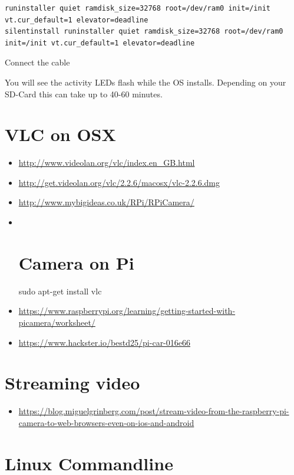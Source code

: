 \begin{verbatim}
runinstaller quiet ramdisk_size=32768 root=/dev/ram0 init=/init vt.cur_default=1 elevator=deadline
silentinstall runinstaller quiet ramdisk_size=32768 root=/dev/ram0 init=/init vt.cur_default=1 elevator=deadline
\end{verbatim}

Connect the cable

You will see the activity LEDs flash while the OS installs. Depending on
your SD-Card this can take up to 40-60 minutes.

\section{VLC on OSX}\label{vlc-on-osx}

\begin{itemize}
\item
  \url{http://www.videolan.org/vlc/index.en_GB.html}
\item
  \url{http://get.videolan.org/vlc/2.2.6/macosx/vlc-2.2.6.dmg}
\item
  \url{http://www.mybigideas.co.uk/RPi/RPiCamera/}
\item ~
  \section{Camera on Pi}\label{camera-on-pi}

  sudo apt-get install vlc
\item
  \url{https://www.raspberrypi.org/learning/getting-started-with-picamera/worksheet/}
\item
  \url{https://www.hackster.io/bestd25/pi-car-016e66}
\end{itemize}

\section{Streaming video}\label{streaming-video}

\begin{itemize}

\item
  \url{https://blog.miguelgrinberg.com/post/stream-video-from-the-raspberry-pi-camera-to-web-browsers-even-on-ios-and-android}
\end{itemize}

\section{Linux Commandline}\label{linux-commandline}

